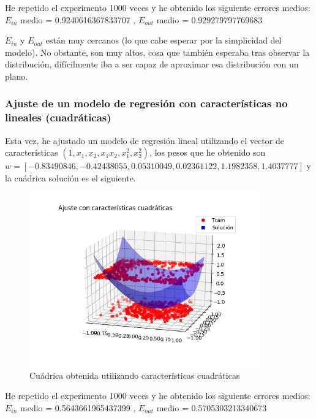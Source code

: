 \documentclass[a4]{article}
\begin{document}
\vspace{-5mm}

He repetido el experimento 1000 veces y he obtenido los siguiente 
errores medios: \\
$E_{in}$ medio =  0.9240616367833707 ,\qquad
$E_{out}$ medio =  0.929279797769683

$E_{in}$ y $E_{out}$ están muy cercanos (lo que cabe esperar por la simplicidad del modelo).
No obstante, son muy altos, cosa que también esperaba tras observar la 
distribución, difícilmente iba a ser capaz de aproximar esa distribución con un plano.

\subsubsection{Ajuste de un modelo de regresión con características no lineales (cuadráticas)}

Esta vez, he ajustado un modelo de regresión lineal utilizando el vector de características
$(1,x_1,x_2,x_1 x_2,x_1^2,x_2^2)$, los pesos que he obtenido son
$w = [-0.83490846,-0.42438055,0.05310049,0.02361122,1.1982358,1.4037777]$
y la cuádrica solución es el siguiente. \vspace{-4mm}

\begin{figure}[H]
    \centering    
    \includegraphics[width=100mm]{imgs/regress-nolin.png}
    \caption{Cuádrica obtenida utilizando características cuadráticas}
    \label{fig:regress-nolin}
\end{figure}

\vspace{-5mm}

He repetido el experimento 1000 veces y he obtenido los siguiente 
errores medios: \\
$E_{in}$ medio =  0.5643661965437399 , \qquad
$E_{out}$ medio =  0.5705303213340673
\end{document}
